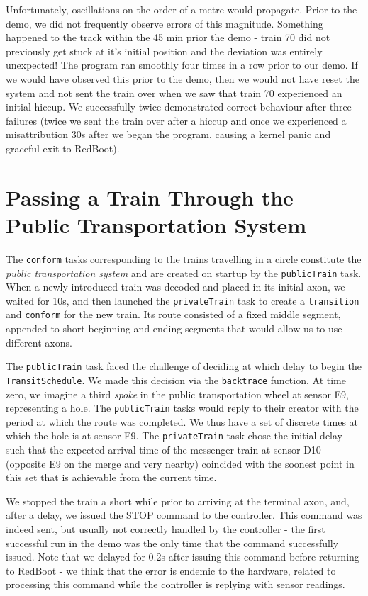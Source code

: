 \documentclass{amsart} \usepackage{amsmath} \usepackage{upgreek}
\newcommand{\x}[1]{\texttt{#1}}
\begin{document}
Unfortunately, oscillations on the order of a metre would propagate. Prior to
the demo, we did not frequently observe errors of this magnitude. Something
happened to the track within the 45 min prior the demo - train 70 did not
previously get stuck at it's initial position and the deviation was entirely
unexpected! The program ran smoothly four times in a row prior to our demo. If
we would have observed this prior to the demo, then we would not have reset the
system and not sent the train over when we saw that train 70 experienced an
initial hiccup. We successfully twice demonstrated correct behaviour after three
failures (twice we sent the train over after a hiccup and once we experienced a
misattribution 30s after we began the program, causing a kernel panic and
graceful exit to RedBoot).

\section*{Passing a Train Through the Public Transportation System}

The \x{conform} tasks corresponding to the trains travelling in a circle
constitute the \textit{public transportation system} and are created on startup
by the \x{publicTrain} task. When a newly introduced train was decoded and
placed in its initial axon, we waited for 10s, and then launched the
\x{privateTrain} task to create a \x{transition} and \x{conform} for the new
train. Its route consisted of a fixed middle segment, appended to short
beginning and ending segments that would allow us to use different axons.

The \x{publicTrain} task faced the challenge of deciding at which delay to begin
the \x{TransitSchedule}. We made this decision via the \x{backtrace} function.
At time zero, we imagine a third \textit{spoke} in the public transportation
wheel at sensor E9, representing a hole. The \x{publicTrain} tasks would reply
to their creator with the period at which the route was completed. We thus have
a set of discrete times at which the hole is at sensor E9. The \x{privateTrain}
task chose the initial delay such that the expected arrival time of the
messenger train at sensor D10 (opposite E9 on the merge and very nearby)
coincided with the soonest point in this set that is achievable from the current
time.

We stopped the train a short while prior to arriving at the terminal axon, and,
after a delay, we issued the STOP command to the controller. This command was
indeed sent, but usually not correctly handled by the controller - the first
successful run in the demo was the only time that the command successfully
issued. Note that we delayed for 0.2s after issuing this command before
returning to RedBoot - we think that the error is endemic to the hardware,
related to processing this command while the controller is replying with sensor
readings.
\end{document}
